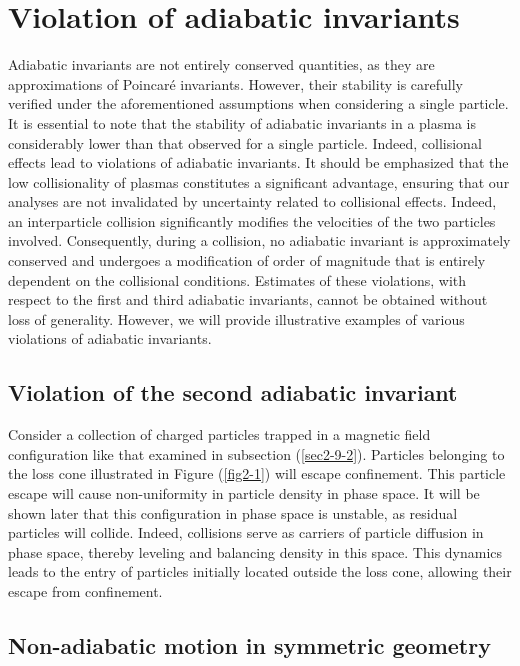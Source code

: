 \section{Violation of adiabatic invariants}

Adiabatic invariants are not entirely conserved quantities, as they are approximations of Poincaré invariants. However, their stability is carefully verified under the aforementioned assumptions when considering a single particle. It is essential to note that the stability of adiabatic invariants in a plasma is considerably lower than that observed for a single particle. Indeed, collisional effects lead to violations of adiabatic invariants. It should be emphasized that the low collisionality of plasmas constitutes a significant advantage, ensuring that our analyses are not invalidated by uncertainty related to collisional effects. Indeed, an interparticle collision significantly modifies the velocities of the two particles involved. Consequently, during a collision, no adiabatic invariant is approximately conserved and undergoes a modification of order of magnitude that is entirely dependent on the collisional conditions. Estimates of these violations, with respect to the first and third adiabatic invariants, cannot be obtained without loss of generality. However, we will provide illustrative examples of various violations of adiabatic invariants.

\subsection{Violation of the second adiabatic invariant}

Consider a collection of charged particles trapped in a magnetic field configuration like that examined in subsection (\ref{sec2-9-2}). Particles belonging to the loss cone illustrated in Figure (\ref{fig2-1}) will escape confinement. This particle escape will cause non-uniformity in particle density in phase space. It will be shown later that this configuration in phase space is unstable, as residual particles will collide. Indeed, collisions serve as carriers of particle diffusion in phase space, thereby leveling and balancing density in this space. This dynamics leads to the entry of particles initially located outside the loss cone, allowing their escape from confinement.

\subsection{Non-adiabatic motion in symmetric geometry}

